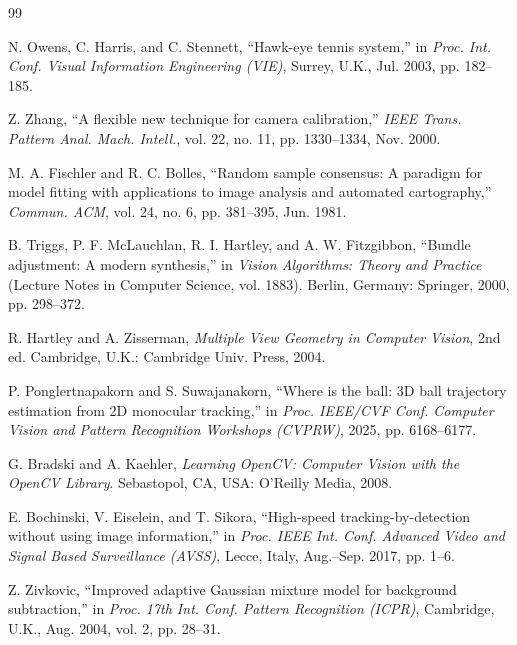 \documentclass[12pt,a4paper]{report}
\begin{document}
\begin{thebibliography}{99}

 N. Owens, C. Harris, and C. Stennett, ``Hawk-eye tennis system,'' in \textit{Proc. Int. Conf. Visual Information Engineering (VIE)}, Surrey, U.K., Jul. 2003, pp. 182--185.

 Z. Zhang, ``A flexible new technique for camera calibration,'' \textit{IEEE Trans. Pattern Anal. Mach. Intell.}, vol. 22, no. 11, pp. 1330--1334, Nov. 2000.

 M. A. Fischler and R. C. Bolles, ``Random sample consensus: A paradigm for model fitting with applications to image analysis and automated cartography,'' \textit{Commun. ACM}, vol. 24, no. 6, pp. 381--395, Jun. 1981.

 B. Triggs, P. F. McLauchlan, R. I. Hartley, and A. W. Fitzgibbon, ``Bundle adjustment: A modern synthesis,'' in \textit{Vision Algorithms: Theory and Practice} (Lecture Notes in Computer Science, vol. 1883). Berlin, Germany: Springer, 2000, pp. 298--372.

 R. Hartley and A. Zisserman, \textit{Multiple View Geometry in Computer Vision}, 2nd ed. Cambridge, U.K.: Cambridge Univ. Press, 2004.

 P. Ponglertnapakorn and S. Suwajanakorn, ``Where is the ball: 3D ball trajectory estimation from 2D monocular tracking,'' in \textit{Proc. IEEE/CVF Conf. Computer Vision and Pattern Recognition Workshops (CVPRW)}, 2025, pp. 6168--6177.

 G. Bradski and A. Kaehler, \textit{Learning OpenCV: Computer Vision with the OpenCV Library}. Sebastopol, CA, USA: O'Reilly Media, 2008.

 E. Bochinski, V. Eiselein, and T. Sikora, ``High-speed tracking-by-detection without using image information,'' in \textit{Proc. IEEE Int. Conf. Advanced Video and Signal Based Surveillance (AVSS)}, Lecce, Italy, Aug.--Sep. 2017, pp. 1--6.

 Z. Zivkovic, ``Improved adaptive Gaussian mixture model for background subtraction,'' in \textit{Proc. 17th Int. Conf. Pattern Recognition (ICPR)}, Cambridge, U.K., Aug. 2004, vol. 2, pp. 28--31.


\end{thebibliography}
\end{document}
